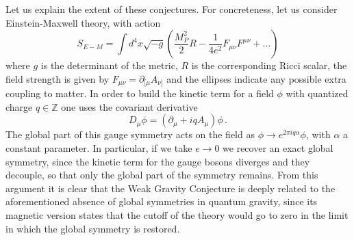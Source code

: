 \documentclass[11pt,a4paper]{article}
\begin{document}
\noindent Let us explain the extent of these conjectures. For concreteness, let us consider Einstein-Maxwell theory, with action
\begin{equation}
\label{eq:EinsteinMaxwell}
S_{E-M}=\int d^{4} x \sqrt{-g}\left(\frac{M_{P}^{2}}{2} R-\frac{1}{4 e^{2}} F_{\mu \nu} F^{\mu \nu}+\ldots\right)
\end{equation}
where $g$ is the determinant of the metric, $R$ is the corresponding Ricci scalar, the field strength is given by $F_{\mu \nu}=\partial_{[\mu} A_{\nu]}$ and the ellipses indicate any possible extra coupling to matter. In order to build the kinetic term for a field $\phi$ with quantized charge $q \in \mathbb{Z}$ one uses the covariant derivative
\begin{equation}
D_\mu \phi= \left(\partial_\mu + i q A_\mu \right) \phi \, .
\end{equation}
The global part of this gauge symmetry acts on the field as $\phi \rightarrow e^{2\pi i q \alpha} \phi$, with $\alpha$ a constant parameter. In particular, if we take $e\rightarrow 0$ we recover an exact global symmetry, since the kinetic term for the gauge bosons diverges and they decouple, so that only the global part of the symmetry remains. From this argument  it is clear that the Weak Gravity Conjecture is deeply related to the aforementioned absence of global symmetries in quantum gravity, since its magnetic version states that the cutoff of the theory would go to zero in the limit in which the global symmetry is restored. 
\end{document}
